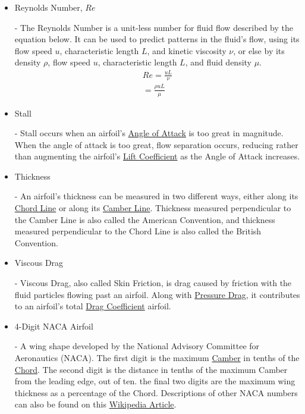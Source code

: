\documentclass{article}
\begin{document}
\begin{itemize}
	\item \hypertarget{Re}{Reynolds Number, $Re$} - The Reynolds Number is a unit-less number for fluid flow described by the equation below. It can be used to predict patterns in the fluid's flow, using its flow speed $u$, characteristic length $L$, and kinetic viscosity $\nu$, or else by its density $\rho$, flow speed $u$, characteristic length $L$, and fluid density $\mu$.
		\begin{equation} \label{eq:17}
		\begin{aligned}
        			Re = \frac{uL}{\nu} \\
			= \frac{\rho uL}{\mu} 
	    	\end{aligned}
		\end{equation}
	
	\item \hypertarget{ST}{Stall} - Stall occurs when an airfoil's \hyperlink{alpha}{Angle of Attack} is too great in magnitude. When the angle of attack is too great, flow separation occurs, reducing rather than augmenting the airfoil's \hyperlink{CL}{Lift Coefficient} as the Angle of Attack increases.
	
	\item \hypertarget{Th}{Thickness} - An airfoil's thickness can be measured in two different ways, either along its \hyperlink{c}{Chord Line} or along its \hyperlink{Camber}{Camber Line}. Thickness measured perpendicular to the Camber Line is also called the American Convention, and thickness measured perpendicular to the Chord Line is also called the British Convention.
	
	\item \hypertarget{VD}{Viscous Drag} - Viscous Drag, also called Skin Friction, is drag caused by friction with the fluid particles flowing past an airfoil. Along with \hyperlink{PD}{Pressure Drag}, it contributes to an airfoil's total \hyperlink{CD}{Drag Coefficient} airfoil.
		
	\item \hypertarget{NACA}{4-Digit NACA Airfoil} - A wing shape developed by the National Advisory Committee for Aeronautics (NACA). The first digit is the maximum \hyperlink{Camber}{Camber} in tenths of the \hyperlink{c}{Chord}. The second digit is the distance in tenths of the maximum Camber from the leading edge, out of ten. the final two digits are the maximum wing thickness as a percentage of the Chord. Descriptions of other NACA numbers can also be found on this \href{https://en.wikipedia.org/wiki/NACA_airfoil}{Wikipedia Article}. 
	
\end{itemize}
\end{document}
